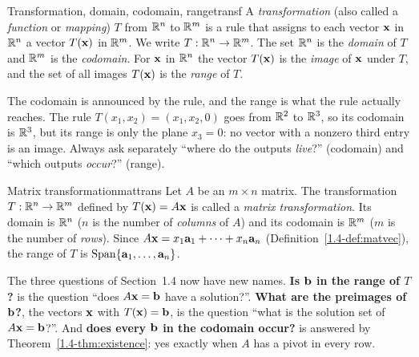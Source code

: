 \documentclass[11pt]{article}
\begin{document}
\begin{defn}{Transformation, domain, codomain, range}{transf}
A \emph{transformation} (also called a \emph{function} or \emph{mapping}) $T$ from $\mathbb{R}^n$ to $\mathbb{R}^m$ is a rule that assigns to each vector $\mathbf{x}$ in $\mathbb{R}^n$ a vector $T(\mathbf{x})$ in $\mathbb{R}^m$. We write $T:\mathbb{R}^n\to\mathbb{R}^m$.
The set $\mathbb{R}^n$ is the \emph{domain} of $T$ and $\mathbb{R}^m$ is the \emph{codomain}. For $\mathbf{x}$ in $\mathbb{R}^n$ the vector $T(\mathbf{x})$ is the \emph{image} of $\mathbf{x}$ under $T$, and the set of all images $T(\mathbf{x})$ is the \emph{range} of $T$.
\end{defn}

\begin{warn}
The codomain is announced by the rule, and the range is what the rule actually reaches. The rule $T(x_1,x_2)=(x_1,x_2,0)$ goes from $\mathbb{R}^2$ to $\mathbb{R}^3$, so its codomain is $\mathbb{R}^3$, but its range is only the plane $x_3=0$: no vector with a nonzero third entry is an image. Always ask separately ``where do the outputs \emph{live}?'' (codomain) and ``which outputs \emph{occur}?'' (range).
\end{warn}

\begin{defn}{Matrix transformation}{mattrans}
Let $A$ be an $m\times n$ matrix. The transformation $T:\mathbb{R}^n\to\mathbb{R}^m$ defined by $T(\mathbf{x})=A\mathbf{x}$ is called a \emph{matrix transformation}. Its domain is $\mathbb{R}^n$ ($n$ is the number of \emph{columns} of $A$) and its codomain is $\mathbb{R}^m$ ($m$ is the number of \emph{rows}). Since $A\mathbf{x}=x_1\mathbf{a}_1+\cdots+x_n\mathbf{a}_n$ (Definition~\ref{1.4-def:matvec}), the range of $T$ is $\operatorname{Span}\{\mathbf{a}_1,\dots,\mathbf{a}_n\}$.
\end{defn}

The three questions of Section~1.4 now have new names. \textbf{Is $\mathbf{b}$ in the range of $T$?} is the question ``does $A\mathbf{x}=\mathbf{b}$ have a solution?''. \textbf{What are the preimages of $\mathbf{b}$?}, the vectors $\mathbf{x}$ with $T(\mathbf{x})=\mathbf{b}$, is the question ``what is the solution set of $A\mathbf{x}=\mathbf{b}$?''. And \textbf{does every $\mathbf{b}$ in the codomain occur?} is answered by Theorem~\ref{1.4-thm:existence}: yes exactly when $A$ has a pivot in every row.
\end{document}
